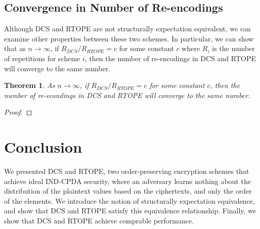 \documentclass[12pt]{article}
\newtheorem{theorem}{Theorem}[section]
\begin{document}
  \subsection{Convergence in Number of Re-encodings}

  Although DCS and RTOPE are not structurally expectation equivalent, we can examine other properties between these two schemes. In particular, we can show that as $n \to \infty$, if $R_{DCS} / R_{RTOPE} = c$ for some constant $c$ where $R_{i}$ is the number of repetitions for scheme $i$, then the number of re-encodings in DCS and RTOPE will converge to the same number.

  \begin{theorem}
    As $n \to \infty$, if $R_{DCS} / R_{RTOPE} = c$ for some constant $c$, then the number of re-econdings in DCS and RTOPE will converge to the same number.
  \end{theorem}
  \begin{proof}
  \end{proof}
  
  \section{Conclusion}
  
  We presented DCS and RTOPE, two order-preserving encryption schemes that achieve ideal IND-CPDA security, where an adversary learns nothing about the distribution of the plaintext values based on the ciphertexts, and only the order of the elements. We introduce the notion of structurally expectation equivalence, and show that DCS and RTOPE satisfy this equivalence relationship. Finally, we show that DCS and RTOPE achieve comprable performance.

  
\end{document}
